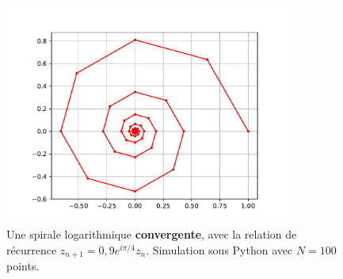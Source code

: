 \documentclass[12pt]{article}
\theoremstyle{definition}
\begin{document}
\begin{figure}[H]
	\centering
	\includegraphics[width=0.86\textwidth]{resources/logaro.pdf}
	\caption{Une spirale logarithmique \textbf{convergente}, avec la relation de récurrence $z_{n+1} = 0,\!9e^{i\pi/4}z_n$. Simulation sous Python avec $N=100$ points.}
\end{figure}
\end{document}
